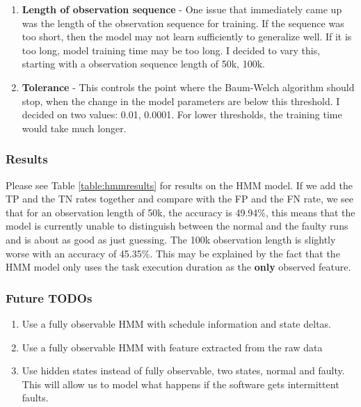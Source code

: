 \begin{enumerate}
  \item \textbf{Length of observation sequence} - One issue that immediately
    came up was the length of the observation sequence for
    training. If the sequence was too short, then the model may not
    learn sufficiently to generalize well. If it is too long, model
    training time may be too long. I decided to vary this, starting
    with a observation sequence length of 50k, 100k. 
  \item \textbf{Tolerance} - This controls the point where the
    Baum-Welch algorithm should stop, when the change in the model
    parameters are below this threshold. I decided on two values:
    0.01, 0.0001. For lower thresholds, the training time
    would take much longer.
\end{enumerate}

\subsubsection{Results}

Please see Table \ref{table:hmmresults} for results on the HMM
model. If we add the TP and the TN rates together and compare with the
FP and the FN rate, we see that for an observation length of 50k, the
accuracy is 49.94\%, this means that the model is currently
unable to distinguish between the normal and the faulty runs and is
about as good as just guessing. The 100k observation length is
slightly worse with an accuracy of 45.35\%. This may be explained by
the fact that the HMM model only uses the task execution duration as
the \textbf{only} observed feature.

\subsubsection{Future TODOs}

\begin{enumerate}
  \item Use a fully observable HMM with schedule information and state
  deltas.
  \item Use a fully observable HMM with feature extracted from the raw
    data
  \item Use hidden states instead of fully observable, two states,
    normal and faulty. This will allow us to model what happens if the
    software gets intermittent faults.
\end{enumerate}


